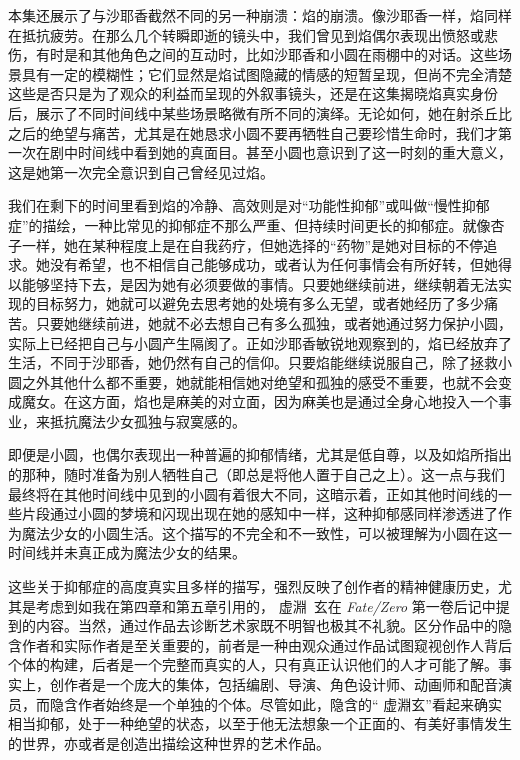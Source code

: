 本集还展示了与沙耶香截然不同的另一种崩溃：焰的崩溃。像沙耶香一样，焰同样在抵抗疲劳。在那么几个转瞬即逝的镜头中，我们曾见到焰偶尔表现出愤怒或悲伤，有时是和其他角色之间的互动时，比如沙耶香和小圆在雨棚中的对话。这些场景具有一定的模糊性；它们显然是焰试图隐藏的情感的短暂呈现，但尚不完全清楚这些是否只是为了观众的利益而呈现的外叙事镜头，还是在这集揭晓焰真实身份后，展示了不同时间线中某些场景略微有所不同的演绎。无论如何，她在射杀丘比之后的绝望与痛苦，尤其是在她恳求小圆不要再牺牲自己要珍惜生命时，我们才第一次在剧中时间线中看到她的真面目。甚至小圆也意识到了这一时刻的重大意义，这是她第一次完全意识到自己曾经见过焰。

我们在剩下的时间里看到焰的冷静、高效则是对“功能性抑郁”或叫做“慢性抑郁症”的描绘，一种比常见的抑郁症不那么严重、但持续时间更长的抑郁症\cite{ref47}。就像杏子一样，她在某种程度上是在自我药疗，但她选择的“药物”是她对目标的不停追求。她没有希望，也不相信自己能够成功，或者认为任何事情会有所好转，但她得以能够坚持下去，是因为她有必须要做的事情。只要她继续前进，继续朝着无法实现的目标努力，她就可以避免去思考她的处境有多么无望，或者她经历了多少痛苦。只要她继续前进，她就不必去想自己有多么孤独，或者她通过努力保护小圆，实际上已经把自己与小圆产生隔阂了。正如沙耶香敏锐地观察到的，焰已经放弃了生活，不同于沙耶香，她仍然有自己的信仰。只要焰能继续说服自己，除了拯救小圆之外其他什么都不重要，她就能相信她对绝望和孤独的感受不重要，也就不会变成魔女。在这方面，焰也是麻美的对立面，因为麻美也是通过全身心地投入一个事业，来抵抗魔法少女孤独与寂寞感的。

即便是小圆，也偶尔表现出一种普遍的抑郁情绪，尤其是低自尊，以及如焰所指出的那种，随时准备为别人牺牲自己（即总是将他人置于自己之上）。这一点与我们最终将在其他时间线中见到的小圆有着很大不同，这暗示着，正如其他时间线的一些片段通过小圆的梦境和闪现出现在她的感知中一样，这种抑郁感同样渗透进了作为魔法少女的小圆生活。这个描写的不完全和不一致性，可以被理解为小圆在这一时间线并未真正成为魔法少女的结果。

这些关于抑郁症的高度真实且多样的描写，强烈反映了创作者的精神健康历史，尤其是考虑到如我在第四章和第五章引用的， 虚淵\, 玄在 \emph{Fate/Zero} 第一卷后记中提到的内容。当然，通过作品去诊断艺术家既不明智也极其不礼貌。区分作品中的隐含作者和实际作者是至关重要的，前者是一种由观众通过作品试图窥视创作人背后个体的构建，后者是一个完整而真实的人，只有真正认识他们的人才可能了解。事实上，创作者是一个庞大的集体，包括编剧、导演、角色设计师、动画师和配音演员，而隐含作者始终是一个单独的个体。尽管如此，隐含的“ 虚淵玄”看起来确实相当抑郁，处于一种绝望的状态，以至于他无法想象一个正面的、有美好事情发生的世界，亦或者是创造出描绘这种世界的艺术作品。

